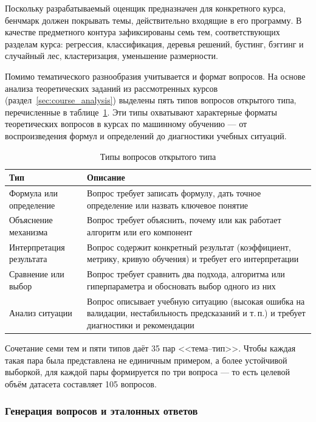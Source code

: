 Поскольку разрабатываемый оценщик предназначен для конкретного курса,
бенчмарк должен покрывать темы, действительно входящие в его программу.
В качестве предметного контура зафиксированы семь тем, соответствующих
разделам курса: регрессия, классификация, деревья решений, бустинг,
бэггинг и случайный лес, кластеризация, уменьшение размерности.

Помимо тематического разнообразия учитывается и формат вопросов. На основе
анализа теоретических заданий из рассмотренных курсов
(раздел~\ref{sec:course_analysis})
выделены пять типов вопросов открытого типа, перечисленные в
таблице~\ref{tab:question_types}. Эти типы охватывают характерные форматы
теоретических вопросов в курсах по машинному обучению --- от воспроизведения
формул и определений до диагностики учебных ситуаций.

\begin{table}[h!]
\caption{Типы вопросов открытого типа}
\label{tab:question_types}
\centering
\begin{tabular}{|p{4.5cm}|p{10cm}|}
\hline
\textbf{Тип} & \textbf{Описание} \\
\hline
Формула или определение &
Вопрос требует записать формулу, дать точное определение
или назвать ключевое понятие \\
\hline
Объяснение механизма &
Вопрос требует объяснить, почему или как работает
алгоритм или его компонент \\
\hline
Интерпретация результата &
Вопрос содержит конкретный результат (коэффициент, метрику, кривую обучения)
и требует его интерпретации \\
\hline
Сравнение или выбор &
Вопрос требует сравнить два подхода, алгоритма или гиперпараметра
и обосновать выбор одного из них \\
\hline
Анализ ситуации &
Вопрос описывает учебную ситуацию (высокая ошибка на валидации,
нестабильность предсказаний и т.\,п.) и требует диагностики
и рекомендации \\
\hline
\end{tabular}
\end{table}

Сочетание семи тем и пяти типов даёт 35 пар <<тема--тип>>. Чтобы каждая такая
пара была представлена не единичным примером, а более устойчивой выборкой,
для каждой пары формируется по три вопроса --- то есть целевой объём датасета
составляет 105 вопросов.

\subsubsection{Генерация вопросов и эталонных ответов}


